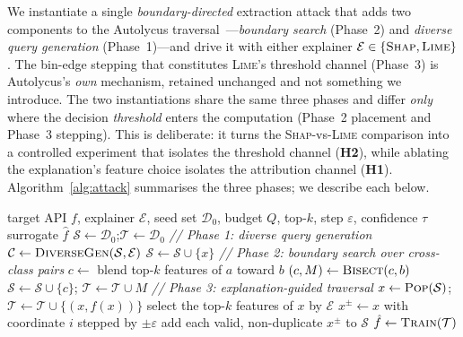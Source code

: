 \documentclass[sigconf,anonymous,review]{acmart}
\begin{document}
We instantiate a single \emph{boundary-directed} extraction attack that adds two components to the
Autolycus traversal~\cite{oksuz2024autolycus}---\emph{boundary search} (Phase~2) and \emph{diverse
query generation} (Phase~1)---and drive it with either explainer
$\mathcal{E} \in \{\textsc{Shap}, \textsc{Lime}\}$. The bin-edge stepping that constitutes
\textsc{Lime}'s threshold channel (Phase~3) is Autolycus's \emph{own} mechanism, retained unchanged
and not something we introduce. The two instantiations share the same three phases and differ
\emph{only} where the decision \emph{threshold} enters the computation (Phase~2 placement and Phase~3
stepping). This is deliberate: it turns the \textsc{Shap}-vs-\textsc{Lime} comparison into a
controlled experiment that isolates the threshold channel (\textbf{H2}), while ablating the
explanation's feature choice isolates the attribution channel (\textbf{H1}). Algorithm~\ref{alg:attack}
summarises the three phases; we describe each below.

\begin{algorithm}[t]
\caption{Boundary-directed explanation-guided extraction, instantiated with explainer
$\mathcal{E}\in\{\textsc{Shap},\textsc{Lime}\}$.}
\label{alg:attack}
\begin{algorithmic}[1]
\Require target API $f$, explainer $\mathcal{E}$, seed set $\mathcal{D}_0$, budget $Q$,
top-$k$, step $\varepsilon$, confidence $\tau$
\Ensure surrogate $\hat{f}$
\State $\mathcal{S} \gets \mathcal{D}_0$;\quad $\mathcal{T} \gets \mathcal{D}_0$
\Statex \textit{// Phase 1: diverse query generation}
\State $\mathcal{C} \gets \textsc{DiverseGen}(\mathcal{S}, \mathcal{E})$
   \State $\mathcal{S} \gets \mathcal{S} \cup \{x\}$
  \EndIf
\EndFor
\Statex \textit{// Phase 2: boundary search over cross-class pairs}
  \State $c \gets$ blend top-$k$ features of $a$ toward $b$
  \State $(c, M) \gets \textsc{Bisect}(c, b)$ 
  \State $\mathcal{S} \gets \mathcal{S} \cup \{c\}$;\quad
         $\mathcal{T} \gets \mathcal{T} \cup M$ 
\EndFor
\Statex \textit{// Phase 3: explanation-guided traversal}
  \State $x \gets \textsc{Pop}(\mathcal{S})$;\quad
         $\mathcal{T} \gets \mathcal{T} \cup \{(x, f(x))\}$
  \State select the top-$k$ features of $x$ by $\mathcal{E}$
     \State $x^{\pm} \gets x$ with coordinate $i$ stepped by $\pm\varepsilon$
     \State add each valid, non-duplicate $x^{\pm}$ to $\mathcal{S}$
  \EndFor
\EndWhile
\State \Return $\hat{f} \gets \textsc{Train}(\mathcal{T})$
\end{algorithmic}
\end{algorithm}
\end{document}

